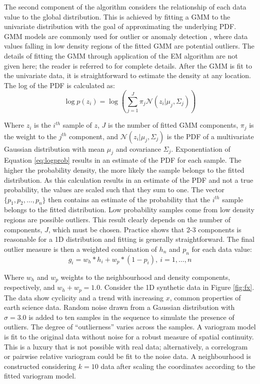The second component of the algorithm considers the relationship of each data value to the global distribution. This is achieved by fitting a \gls{GMM} to the univariate distribution with the goal of approximating the underlying \gls{PDF}. \Gls{GMM} models are commonly used for outlier or anomaly detection \citep{geron2019hands,qu2021anomaly}, where data values falling in low density regions of the fitted \gls{GMM} are potential outliers. The details of fitting the \gls{GMM} through application of the \gls{EM} algorithm are not given here; the reader is referred to \cite{mclachlan2019finite} for complete details. After the \gls{GMM} is fit to the univariate data, it is straightforward to estimate the density at any location. The log of the \gls{PDF} is calculated as:
\begin{equation}
    \log p(z_{i}) = \log \left( \sum_{j=1}^{J} \pi_{j} \mathcal{N}(z_{i}|\mu_{j}, \Sigma_{j}) \right)
    \label{eq:logprob}
\end{equation}

Where $z_{i}$ is the $i^{th}$ sample of $z$, $J$ is the number of fitted \gls{GMM} components, $\pi_{j}$ is the weight to the $j^{th}$ component, and $\mathcal{N}(z_{i}|\mu_{j}, \Sigma_{j})$ is the \gls{PDF} of a multivariate Gaussian distribution with mean $\mu_{j}$ and covariance $\Sigma_{j}$. Exponentiation of Equation \ref{eq:logprob} results in an estimate of the \gls{PDF} for each sample. The higher the probability density, the more likely the sample belongs to the fitted distribution. As this calculation results in an estimate of the \gls{PDF} and not a true probability, the values are scaled such that they sum to one. The vector $\{p_{1}, p_{2}, \dots, p_{n}\}$ then contains an estimate of the probability that the $i^{th}$ sample belongs to the fitted distribution. Low probability samples come from low density regions are possible outliers. This result clearly depends on the number of components, $J$, which must be chosen. Practice shows that 2-3 components is reasonable for a \gls{1D} distribution and fitting is generally straightforward. The final outlier measure is then a weighted combination of $h_{n}$ and $p_{n}$ for each data value:
\begin{equation}
    g_{i} = w_{h}*h_{i} + w_{p}*(1-p_{i}), \ i = 1, \dots, n
    \label{eq:outlier}
\end{equation}

Where $w_{h}$ and $w_{p}$ weights to the neighbourhood and density components, respectively, and $w_{h}+w_{p}=1.0$. Consider the \gls{1D} synthetic data in Figure \ref{fig:fx}. The data show cyclicity and a trend with increasing $x$, common properties of earth science data. Random noise drawn from a Gaussian distribution with $\sigma=3.0$ is added to ten samples in the sequence to simulate the presence of outliers. The degree of ``outlierness'' varies across the samples. A variogram model is fit to the original data without noise for a robust measure of spatial continuity. This is a luxury that is not possible with real data; alternatively, a correlogram or pairwise relative variogram could be fit to the noise data. A neighbourhood is constructed considering $k=10$ data after scaling the coordinates according to the fitted variogram model.

